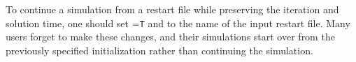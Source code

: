 \noindent\NOTE
To continue a simulation from a restart file while preserving the iteration
and solution time, one should set
  =\texttt{T} and
   to the name of the input restart file.
Many users forget to make these changes, and their simulations start over
from the previously specified initialization rather than continuing the
simulation.

%
\vspace{1.0em} %



